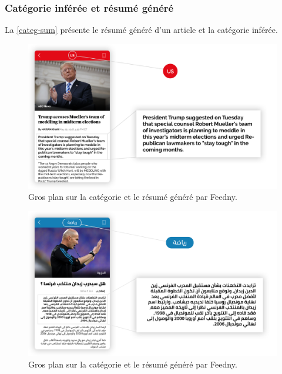     \subsubsection{Catégorie inférée et résumé généré}
    La \autoref{categ-sum} présente le résumé généré d'un article et la catégorie inférée.
        \begin{figure}[H]
            \centering
            \includegraphics[width=410pt]{img/chapter4/feedny/en-summary.png}
            \caption{Gros plan sur la catégorie et le résumé généré par \textquotedbl Feedny\textquotedbl.}
            \label{categ-sum}
        \end{figure}

        \begin{figure}[H]
            \centering
            \includegraphics[width=410pt]{img/chapter4/feedny/ar-summary.png}
            \caption{Gros plan sur la catégorie et le résumé généré par \textquotedbl Feedny\textquotedbl.}
            \label{categ-sum}
        \end{figure}

